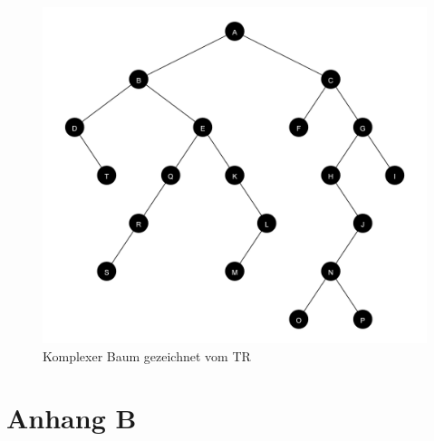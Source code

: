 \begin{figure}[ht]
    \centering
    \includegraphics[scale = 0.11]{abbildungen/komplex_a3}
    \caption{Komplexer Baum gezeichnet vom \ac{TR}}
    \label{pic:komplex_a3}
\end{figure}

\chapter{Anhang B}
\label{chap:anhang_b}










